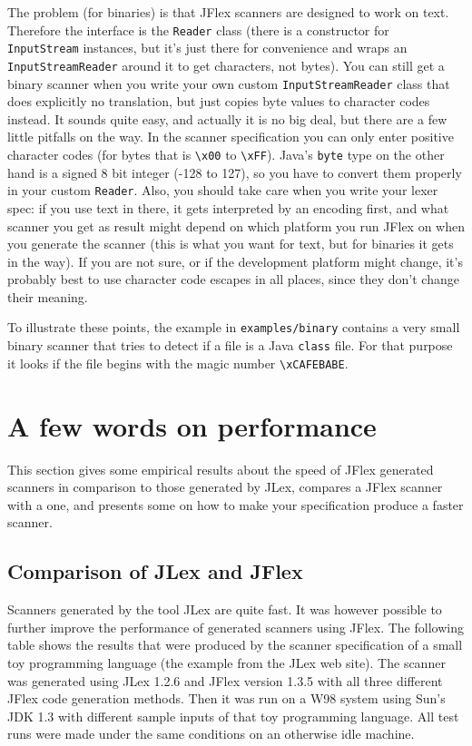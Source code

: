 \documentclass[11pt]{scrartcl}
\begin{document}
The problem (for binaries) is that JFlex scanners are
designed to work on text. Therefore the interface is
the \texttt{Reader} class (there is a constructor
for \texttt{InputStream} instances, but it's just there
for convenience and wraps an \texttt{InputStreamReader}
around it to get characters, not bytes). 
You can still get a binary scanner when you write 
your own custom \texttt{InputStreamReader} class that
does explicitly no translation, but just copies
byte values to character codes instead. It sounds
quite easy, and actually it is no big deal, but there 
are a few little pitfalls on the way. In the scanner
specification you can only enter positive character
codes (for bytes that is \verb+\x00+
to \verb+\xFF+). Java's \texttt{byte} type on the other hand
is a signed 8 bit integer (-128 to 127), so you have to convert 
them properly in your custom \texttt{Reader}. Also, you should
take care when you write your lexer spec: if you
use text in there, it gets interpreted by an encoding
first, and what scanner you get as result might depend
on which platform you run JFlex on when you generate
the scanner (this is what you want for text, but for binaries it
gets in the way). If you are not sure, or if the development
platform might change, it's probably best to use character 
code escapes in all places, since they don't change their
meaning.

To illustrate these points, the example in \texttt{examples/binary} 
contains a very small binary scanner that tries to
detect if a file is a Java \texttt{class} file. For that
purpose it looks if the file begins with the magic number \verb+\xCAFEBABE+.

\section{A few words on performance\label{performance}}
This section gives some empirical results about the speed of JFlex generated
scanners in comparison to those generated by JLex,
compares a JFlex scanner with a  
one, and presents some  on how to make
your specification produce a faster scanner.

\subsection{Comparison of JLex and JFlex\label{PerformanceJLex}}
Scanners generated by the tool JLex are quite fast. It was however
possible to further improve the performance of generated scanners
using JFlex. The following table shows the results that were produced
by the scanner specification of a small toy programming language (the
example from the JLex web site). The scanner was generated using JLex
1.2.6 and JFlex version 1.3.5 with all three different JFlex code
generation methods. Then it was run on a W98 system using Sun's JDK
1.3 with different sample inputs of that toy programming language. All
test runs were made under the same conditions on an otherwise idle
machine.
\end{document}
